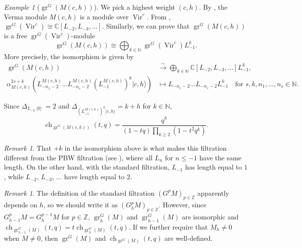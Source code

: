 \documentclass[a4paper, 12pt, reqno]{amsart}
\theoremstyle{remark}
\newtheorem{remark}[theorem]{Remark}
\newtheorem{example}[theorem]{Example}
\DeclareMathOperator{\Vir}{Vir}
\DeclareMathOperator{\gr}{gr}
\DeclareMathOperator{\ch}{ch}
\DeclareMathOperator{\vac}{|0\rangle}
\begin{document}
\begin{example}[$\gr^G(M(c, h))$]
  \label{exa:15}
  We pick a highest weight $(c, h)$.
  By , the Verma module $M(c, h)$ is a module over $\Vir^c$.
  From , $\gr^G(\Vir^c) \cong \mathbb{C}[L_{-2}, L_{-3}, \dots]$.
  Similarly, we can prove that $\gr^G(M(c, h))$ is a free $\gr^G(\Vir^c)$-module
  \begin{equation*}
    \gr^G(M(c, h)) \cong \bigoplus_{k \in \mathbb{N}}\gr^G(\Vir^c)L_{-1}^k.
  \end{equation*}
  More precisely, the isomorphism is given by
  \begin{align*}
    \gr^G(M(c, h)) &\xrightarrow{\sim} \bigoplus_{k \in \mathbb{N}}\mathbb{C}[L_{-2}, L_{-3}, \dots]L_{-1}^k, \\
    \alpha_{M(c, h)}^{2s + k}(L_{-n_1 - 2}^{M(c, h)}\dots L_{-n_s - 2}^{M(c, h)}(L_{-1}^{M(c, h)})^k|c, h\rangle) &\mapsto L_{-n_1 - 2}\dots L_{-n_s - 2}L_{-1}^k \quad \text{for $s, k, n_1, \dots, n_s \in \mathbb{N}$}.
  \end{align*}

  Since $\Delta_{L_{-2}\vac} = 2$ and $\Delta_{(L_{-1}^{M(c, h)})^k|c, h\rangle} = k + h$ for $k \in \mathbb{N}$,
  \begin{equation*}
    \ch_{\gr^G(M(c, h))}(t, q) = \frac{q^h}{(1 - tq)\prod_{k \ge 2}(1 - t^2q^k)}.
  \end{equation*}
\end{example}

\begin{remark}
  \label{rmk:43}
  That $+k$ in the isomorphism above is what makes this filtration different from the PBW filtration (see ), where all $L_n$ for $n \le -1$ have the same length.
  On the other hand, with the standard filtration, $L_{-1}$ has length equal to $1$, while $L_{-2}$, $L_{-3}$, $\dots$ have length equal to $2$.
\end{remark}

\begin{remark}
  \label{rmk:44}
  The definition of the standard filtration $(G^pM)_{p \in \mathbb{Z}}$ apparently depends on $h$, so we should write it as $(G^p_hM)_{p \in \mathbb{Z}}$.
  However, since $G^p_{h - 1}M = G^{p - 1}_hM$ for $p \in \mathbb{Z}$, $\gr^G_h(M)$ and $\gr^G_{h - 1}(M)$ are isomorphic and $\ch_{\gr^G_{h - 1}(M)}(t, q) = t\ch_{\gr^G_h(M)}(t, q)$.
  If we further require that $M_h \neq 0$ when $M \neq 0$, then $\gr^G(M)$ and $\ch_{\gr^G(M)}(t, q)$ are well-defined.
\end{remark}
\end{document}
